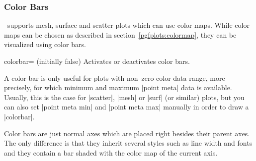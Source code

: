 \subsubsection{Color Bars}
\label{pgfplots:colorbar}
\PGFPlots\ supports mesh, surface and scatter plots which can use color maps. While color maps can be chosen as described in section~\ref{pgfplots:colormap}, they can be visualized using color bars.

\begin{pgfplotskey}{colorbar= (initially false)}
	Activates or deactivates color bars.

\begin{codeexample}[]
\end{codeexample}

\begin{codeexample}[]
\end{codeexample}

\begin{codeexample}[]
\end{codeexample}
	
	A color bar is only useful for plots with non--zero color data range, more precisely, for which minimum and maximum |point meta| data is available. Usually, this is the case for |scatter|, |mesh| or |surf| (or similar) plots, but you can also set |point meta min| and |point meta max| manually in order to draw a |colorbar|. 
	
	Color bars are just normal axes which are placed right besides their parent axes. The only difference is that they inherit several styles such as line width and fonts and they contain a bar shaded with the color map of the current axis.
	

\end{pgfplotskey}
